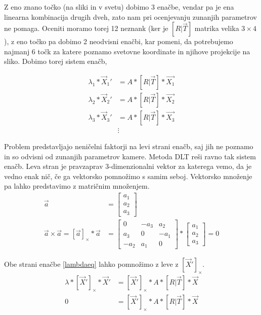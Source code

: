 \documentclass[a4paper, 12pt]{book}
\begin{document}
Z eno znano točko (na sliki in v svetu) dobimo 3 enačbe, vendar pa je ena linearna kombinacija drugih dveh, zato nam pri ocenjevanju zunanjih parametrov ne pomaga. Oceniti moramo torej 12 neznank (ker je $[R | \vec{T}]$ matrika velika $3 \times 4$), z eno točko pa dobimo 2 neodvisni enačbi, kar pomeni, da potrebujemo najmanj 6 točk za katere poznamo svetovne koordinate in njihove projekcije na sliko. Dobimo torej sistem enačb,

\begin{align*}
\lambda_1 * \vec{X}_1' &= A * [R | \vec{T}] * \vec{X_1} \\
\lambda_2 * \vec{X}_2' &= A * [R | \vec{T}] * \vec{X_2} \\
\lambda_3 * \vec{X}_3' &= A * [R | \vec{T}] * \vec{X_3} \\
&\vdots
\end{align*}

Problem predstavljajo neničelni faktorji na levi strani enačb, saj jih ne poznamo in so odvisni od zunanjih parametrov kamere. Metoda DLT reši ravno tak sistem enačb. Leva stran je pravzaprav 3-dimenzionalni vektor za katerega vemo, da je vedno enak nič, če ga vektorsko pomnožimo s samim seboj. Vektorsko množenje pa lahko predstavimo z matričnim množenjem.
\begin{align}
\vec{a} &= 
\begin{bmatrix}
a_1 \\
a_2 \\
a_3
\end{bmatrix} \\
\vec{a} \times \vec{a} = [\vec{a}]_{\times} * \vec{a} &= 
\begin{bmatrix}
0 & -a_3 & a_2 \\
a_3 & 0 & -a_1 \\
-a_2 & a_1 & 0
\end{bmatrix}
* \begin{bmatrix}
a_1 \\
a_2 \\
a_3
\end{bmatrix} = 0
\end{align}

Obe strani enačbe \eqref{lambdaeq} lahko pomnožimo z leve z $[\vec{X}']_{\times}$.
\begin{align}
\lambda * [\vec{X}']_{\times} * \vec{X}' &= [\vec{X}']_{\times} * A * [R | \vec{T}] * \vec{X} \\
0 &= [\vec{X}']_{\times} * A * [R | \vec{T}] * \vec{X}
\end{align}
\end{document}

